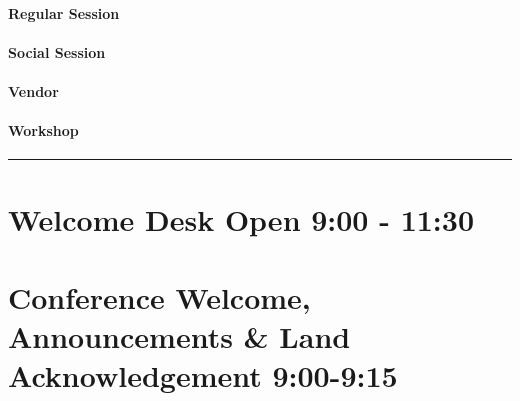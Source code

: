 \documentclass[
]{book}
\begin{document}
\begin{session}
\hypertarget{regular-session}{%
\paragraph{Regular Session}\label{regular-session}}
\end{session}

\begin{social}
\hypertarget{social-session}{%
\paragraph{Social Session}\label{social-session}}
\end{social}
\begin{vendor}
\hypertarget{vendor}{%
\paragraph{Vendor}\label{vendor}}
\end{vendor}

\begin{workshop}
\hypertarget{workshop}{%
\paragraph{Workshop}\label{workshop}}
\end{workshop}

\begin{center}\rule{0.5\linewidth}{0.5pt}\end{center}

\hypertarget{welcome-desk-open-900---1130-2}{%
\section*{Welcome Desk Open \textbar{} 9:00 - 11:30}\label{welcome-desk-open-900---1130-2}}

\hypertarget{conference-welcome-announcements-land-acknowledgement-900-915-2}{%
\section*{Conference Welcome, Announcements \& Land Acknowledgement \textbar{} 9:00-9:15}\label{conference-welcome-announcements-land-acknowledgement-900-915-2}}
\end{document}
